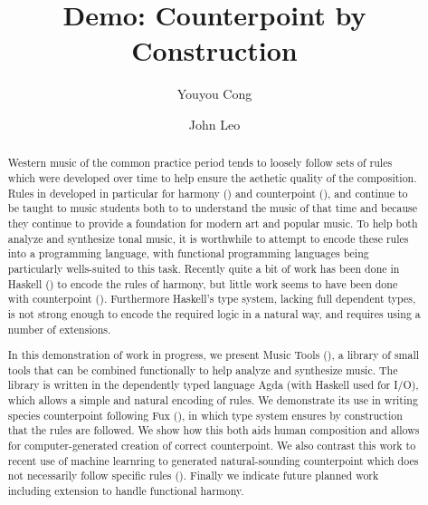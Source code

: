 \documentclass[sigplan,review]{acmart}\settopmatter{printfolios=true,printccs=false,printacmref=false}
\begin{document}
\title{Demo: Counterpoint by Construction}


\author{Youyou Cong}

\author{John Leo}


\begin{abstract}
Western music of the common practice period tends to loosely follow sets of rules which
were developed over time to help ensure the aethetic quality of the composition. Rules in
developed in particular for harmony (\cite{piston1987harmony}) and counterpoint (\cite{fux1965study}),
and continue to be taught to music students
both to to understand the music of that time and because they continue to provide a foundation for
modern art and popular music. To help both analyze and synthesize
tonal music, it is worthwhile to attempt to encode these rules into a programming
language, with functional programming languages being particularly wells-suited to this task.
Recently quite a bit of work has been done in Haskell (\cite{fmmh, hihseufha, faamh, hafha, fghm})
to encode the rules of harmony, but little work seems to have been done with counterpoint (\cite{mezzo}).
Furthermore Haskell's type system, lacking full dependent types, is not strong enough to encode
the required logic in a natural way, and requires using a number of extensions.

In this demonstration of work in progress, we present Music Tools (\cite{MusicTools}), a library of
small tools that can be combined functionally to help analyze and synthesize music. The library is
written in the dependently typed language Agda (with Haskell used for I/O), which allows a simple
and natural encoding of rules. We demonstrate its use in writing species counterpoint following
Fux (\cite{fux1965study}), in which type system ensures by construction that the rules are followed.
We show how this both aids human composition and allows for computer-generated creation of correct
counterpoint. We also contrast this work to recent use of machine learnring to generated natural-sounding
counterpoint which does not necessarily follow specific rules (\cite{CounterpointByConvolution}). Finally
we indicate future planned work including extension to handle functional harmony.
\end{abstract}
\end{document}
